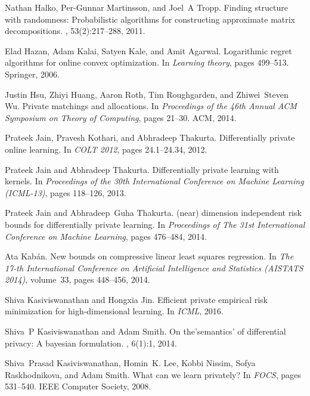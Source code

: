 \documentclass{article}
\theoremstyle{plain}
\begin{document}
\begin{thebibliography}{10}
Nathan Halko, Per-Gunnar Martinsson, and Joel~A Tropp.
\newblock Finding structure with randomness: Probabilistic algorithms for
  constructing approximate matrix decompositions.
, 53(2):217--288, 2011.

Elad Hazan, Adam Kalai, Satyen Kale, and Amit Agarwal.
\newblock Logarithmic regret algorithms for online convex optimization.
\newblock In {\em Learning theory}, pages 499--513. Springer, 2006.

Justin Hsu, Zhiyi Huang, Aaron Roth, Tim Roughgarden, and Zhiwei~Steven Wu.
\newblock Private matchings and allocations.
\newblock In {\em Proceedings of the 46th Annual ACM Symposium on Theory of
  Computing}, pages 21--30. ACM, 2014.

Prateek Jain, Pravesh Kothari, and Abhradeep Thakurta.
\newblock Differentially private online learning.
\newblock In {\em {COLT} 2012}, pages 24.1--24.34, 2012.

Prateek Jain and Abhradeep Thakurta.
\newblock Differentially private learning with kernels.
\newblock In {\em Proceedings of the 30th International Conference on Machine
  Learning (ICML-13)}, pages 118--126, 2013.

Prateek Jain and Abhradeep~Guha Thakurta.
\newblock (near) dimension independent risk bounds for differentially private
  learning.
\newblock In {\em Proceedings of The 31st International Conference on Machine
  Learning}, pages 476--484, 2014.

Ata Kab{\'a}n.
\newblock New bounds on compressive linear least squares regression.
\newblock In {\em The 17-th International Conference on Artificial Intelligence
  and Statistics (AISTATS 2014)}, volume~33, pages 448--456, 2014.

Shiva Kasiviswanathan and Hongxia Jin.
\newblock Efficient private empirical risk minimization for high-dimensional
  learning.
\newblock In {\em ICML}, 2016.

Shiva~P Kasiviswanathan and Adam Smith.
\newblock On the'semantics' of differential privacy: A bayesian formulation.
, 6(1):1, 2014.

Shiva~Prasad Kasiviswanathan, Homin~K. Lee, Kobbi Nissim, Sofya Raskhodnikova,
  and Adam Smith.
\newblock What can we learn privately?
\newblock In {\em FOCS}, pages 531--540. IEEE Computer Society, 2008.


\end{thebibliography}
\end{document}
